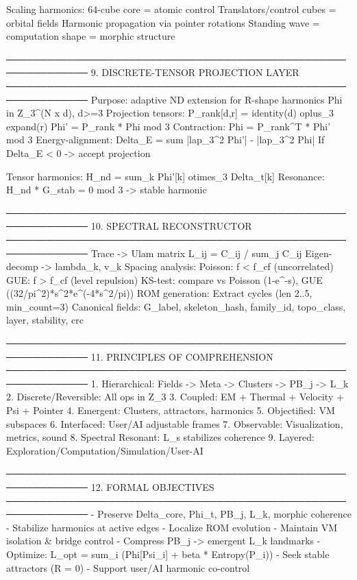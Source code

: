 Scaling harmonics:
  64-cube core = atomic control
  Translators/control cubes = orbital fields
  Harmonic propagation via pointer rotations
  Standing wave = computation shape = morphic structure

──────────────────────────────────────────────────────────────
9. DISCRETE-TENSOR PROJECTION LAYER
──────────────────────────────────────────────────────────────
Purpose: adaptive ND extension for R-shape harmonics
Phi in Z_3^(N x d), d>=3
Projection tensors:
  P_rank[d,r] = identity(d) oplus_3 expand(r)
  Phi' = P_rank * Phi mod 3
  Contraction: Phi = P_rank^T * Phi' mod 3
Energy-alignment:
  Delta_E = sum |lap_3^2 Phi'| - |lap_3^2 Phi|
  If Delta_E < 0 -> accept projection

Tensor harmonics:
  H_nd = sum_k Phi'[k] otimes_3 Delta_t[k]
  Resonance: H_nd * G_stab = 0 mod 3 -> stable harmonic

──────────────────────────────────────────────────────────────
10. SPECTRAL RECONSTRUCTOR
──────────────────────────────────────────────────────────────
Trace -> Ulam matrix L_ij = C_ij / sum_j C_ij
Eigen-decomp -> lambda_k, v_k
Spacing analysis:
  Poisson: f < f_cf (uncorrelated)
  GUE: f > f_cf (level repulsion)
  KS-test: compare vs Poisson (1-e^-s), GUE ((32/pi^2)*s^2*e^(-4*s^2/pi))
ROM generation:
  Extract cycles (len 2..5, min_count=3)
  Canonical fields: G_label, skeleton_hash, family_id, topo_class, layer, stability, crc

──────────────────────────────────────────────────────────────
11. PRINCIPLES OF COMPREHENSION
──────────────────────────────────────────────────────────────
1. Hierarchical: Fields -> Meta -> Clusters -> PB_j -> L_k
2. Discrete/Reversible: All ops in Z_3
3. Coupled: EM + Thermal + Velocity + Psi + Pointer
4. Emergent: Clusters, attractors, harmonics
5. Objectified: VM subspaces
6. Interfaced: User/AI adjustable frames
7. Observable: Visualization, metrics, sound
8. Spectral Resonant: L_s stabilizes coherence
9. Layered: Exploration/Computation/Simulation/User-AI

──────────────────────────────────────────────────────────────
12. FORMAL OBJECTIVES
──────────────────────────────────────────────────────────────
- Preserve Delta_core, Phi_t, PB_j, L_k, morphic coherence
- Stabilize harmonics at active edges
- Localize ROM evolution
- Maintain VM isolation & bridge control
- Compress PB_j -> emergent L_k landmarks
- Optimize: L_opt = sum_i (Phi[Psi_i] + beta * Entropy(P_i))
- Seek stable attractors (R = 0)
- Support user/AI harmonic co-control

